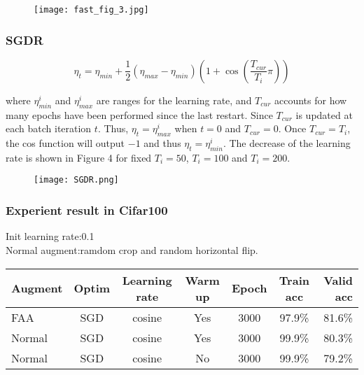 \begin{figure}[H]
	\centering
	\texttt{[image: fast\_fig\_3.jpg]}
\end{figure}

\subsubsection{SGDR}
\begin{equation}
\eta_t = \eta_{min} + \frac{1}{2}(\eta_{max} - \eta_{min})\left(1 +\cos\left(\frac{T_{cur}}{T_{i}}\pi\right)\right)
\end{equation}

where $\eta_{min}^i$ and $\eta_{max}^i$  are ranges for the learning rate, and $T_{cur}$ accounts for how many epochs have been performed since the last restart. Since $T_{cur}$ is updated at each batch iteration $t$. Thus, $\eta_t = \eta_{max}^i$ when $t = 0$ and $T_{cur} = 0$. Once $T_{cur} = T_i$, the cos function will output $-1$ and thus $\eta_t = \eta_{min}^i$. The decrease of the learning rate is shown in Figure 4 for fixed $T_i = 50$, $T_i = 100$ and $T_i = 200$.
\begin{figure}[H]
	\centering
	\texttt{[image: SGDR.png]}
\end{figure}

\subsubsection{Experient result in Cifar100}
Init learning rate:0.1\\
Normal augment:ramdom crop and random horizontal flip.\\
\begin{tabular}{| l | c | c | c | c | c | r |}
	\hline
	Augment & Optim & Learning rate & Warm up & Epoch & Train acc & Valid acc \\
	\hline
	FAA   & SGD   & cosine        & Yes     & 3000  & 97.9\%    & 81.6\%\\
	\hline
	Normal   & SGD   & cosine        & Yes     & 3000  & 99.9\%    & 80.3\%\\
	\hline
	Normal   & SGD   & cosine        & No      & 3000  & 99.9\%    & 79.2\%\\
	\hline
\end{tabular}

